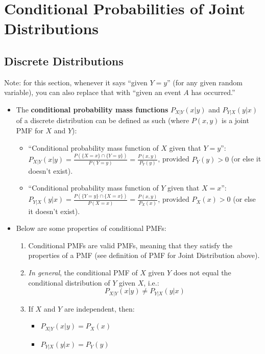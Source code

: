 \documentclass[12pt]{article}
\begin{document}
\section{Conditional Probabilities of Joint Distributions}

\subsection{Discrete Distributions}
Note: for this section, whenever it says ``given $Y=y$'' (for any given random variable), you can also replace that with ``given an event $A$ has occurred.''

\begin{itemize}
	\item The \textbf{conditional probability mass functions} $P_{X | Y}(x|y)$ and $P_{Y | X}(y|x)$ of a discrete distribution can be defined as such (where $P(x, y)$ is a joint PMF for $X$ and $Y$):
	      \begin{itemize}
		      \item ``Conditional probability mass function of $X$ given that
		            $Y=y$'': $P_{X | Y}(x|y) = \frac{P(\{X=x\}\cap
				            \{Y=y\})}{P(Y=y)}=\frac{P(x,y)}{P_Y(y)}$, provided $P_Y(y) >
			            0$ (or else it doesn't exist).
		      \item ``Conditional probability mass function of $Y$ given that
		            $X=x$'': $P_{Y | X}(y|x) = \frac{P(\{Y=y\}\cap
				            \{X=x\})}{P(X=x)}=\frac{P(x,y)}{P_X(x)}$, provided $P_X(x) >
			            0$ (or else it doesn't exist).
	      \end{itemize}
	\item Below are some properties of conditional PMFs:
	      \begin{enumerate}
		      \item Conditional PMFs are valid PMFs, meaning that they satisfy the properties of a PMF (see definition of PMF for Joint Distribution above).
		      \item \emph{In general}, the conditional PMF of $X$ given $Y$ does not equal the conditional distribution of $Y$ given $X$, i.e.:
		            \[
			            P_{X|Y}(x | y) \neq  P_{Y|X}(y | x)
		            \]
		      \item If $X$ and $Y$ are independent, then:
		            \begin{itemize}
			            \item $P_{X|Y}(x | y) = P_X(x)$
			            \item $P_{Y|X}(y | x) = P_Y(y)$

\end{itemize}
\end{enumerate}
\end{itemize}
\end{document}
